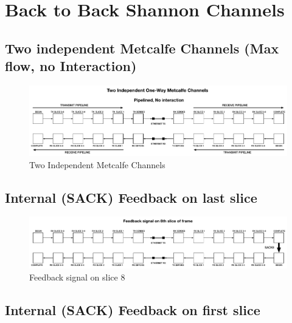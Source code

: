 \documentclass[../../../OAE-SPEC-MAIN.tex]{subfiles}
\begin{document}


\section{Back to Back Shannon Channels}
\vspace{30px}


\subsection{Two independent Metcalfe Channels (Max flow, no Interaction)}

\begin{figure}
\includegraphics[width=\textwidth]{FIGURES/Two-Independent-Metcalfe.pdf}
  \caption{Two Independent Metcalfe Channels}
\end{figure}

\vspace{30px}

\subsection{Internal (SACK) Feedback on last slice}

\begin{figure}
\includegraphics[width=\textwidth]{FIGURES/feedback-slice-8.pdf}
  \caption{Feedback signal on slice 8}
\end{figure}

\vspace{30px}

\subsection{Internal (SACK) Feedback on first slice}
\end{document}
